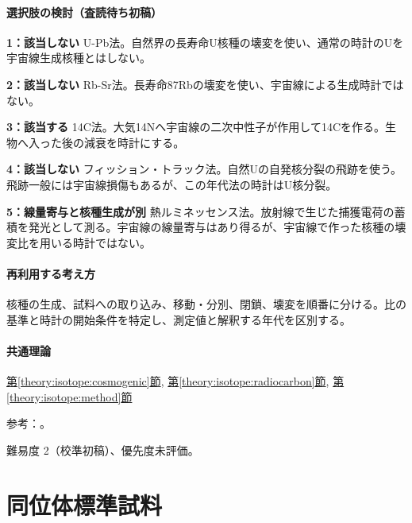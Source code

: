 \paragraph{選択肢の検討（査読待ち初稿）}\mbox{}\par

\noindent\textbf{1：該当しない} U-Pb法。自然界の長寿命U核種の壊変を使い、通常の時計のUを宇宙線生成核種とはしない。\par

\noindent\textbf{2：該当しない} Rb-Sr法。長寿命87Rbの壊変を使い、宇宙線による生成時計ではない。\par

\noindent\textbf{3：該当する} 14C法。大気14Nへ宇宙線の二次中性子が作用して14Cを作る。生物へ入った後の減衰を時計にする。\par

\noindent\textbf{4：該当しない} フィッション・トラック法。自然Uの自発核分裂の飛跡を使う。飛跡一般には宇宙線損傷もあるが、この年代法の時計はU核分裂。\par

\noindent\textbf{5：線量寄与と核種生成が別} 熱ルミネッセンス法。放射線で生じた捕獲電荷の蓄積を発光として測る。宇宙線の線量寄与はあり得るが、宇宙線で作った核種の壊変比を用いる時計ではない。\par

\paragraph{再利用する考え方} 核種の生成、試料への取り込み、移動・分別、閉鎖、壊変を順番に分ける。比の基準と時計の開始条件を特定し、測定値と解釈する年代を区別する。

\paragraph{共通理論} \hyperref[theory:isotope:cosmogenic]{第\ref*{theory:isotope:cosmogenic}節}, \hyperref[theory:isotope:radiocarbon]{第\ref*{theory:isotope:radiocarbon}節}, \hyperref[theory:isotope:method]{第\ref*{theory:isotope:method}節}

\par 参考：\cite{iso_radiometric}。

\par 難易度 2（校準初稿）、優先度未評価。

\section{同位体標準試料}

